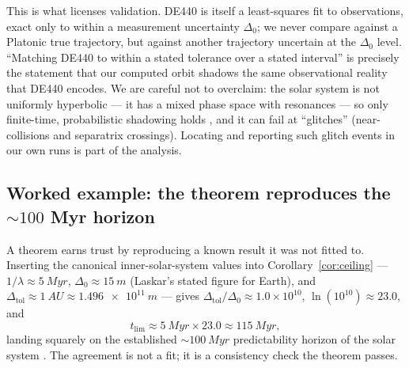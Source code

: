 \documentclass[11pt]{article}
\theoremstyle{definition}
\begin{document}
This is what licenses validation. DE440 is itself a least-squares fit to
observations, exact only to within a measurement uncertainty $\Delta_0$; we
never compare against a Platonic true trajectory, but against another trajectory
uncertain at the $\Delta_0$ level. ``Matching DE440 to within a stated
tolerance over a stated interval'' is precisely the statement that our computed
orbit shadows the same observational reality that DE440 encodes. We are careful
not to overclaim: the solar system is not uniformly hyperbolic --- it has a
mixed phase space with resonances --- so only finite-time, probabilistic
shadowing holds \cite{sgy1997}, and it can fail at ``glitches'' (near-collisions
and separatrix crossings). Locating and reporting such glitch events in our own
runs is part of the analysis.

\subsection{Worked example: the theorem reproduces the \texorpdfstring{$\sim\!100$}{~100} Myr horizon}
\label{sec:worked}
A theorem earns trust by reproducing a known result it was not fitted to.
Inserting the canonical inner-solar-system values into
Corollary~\ref{cor:ceiling} --- $1/\lambda \approx \SI{5}{Myr}$,
$\Delta_0 \approx \SI{15}{m}$ (Laskar's stated figure for Earth), and
$\Delta_{\mathrm{tol}} \approx \SI{1}{AU} \approx \SI{1.496e11}{m}$ --- gives
$\Delta_{\mathrm{tol}}/\Delta_0 \approx 1.0\times 10^{10}$,
$\ln(10^{10}) \approx 23.0$, and
\begin{equation}
t_{\mathrm{lim}} \approx \SI{5}{Myr}\times 23.0 \approx \SI{115}{Myr},
\end{equation}
landing squarely on the established $\sim\!\SI{100}{Myr}$ predictability horizon
of the solar system \cite{laskar1989, laskar2009}. The agreement is not a fit;
it is a consistency check the theorem passes.
\end{document}

